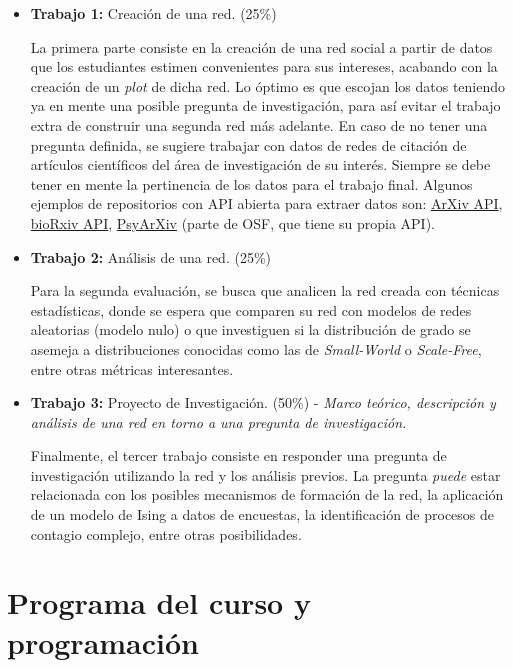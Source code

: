 \documentclass[12pt]{article}
\begin{document}
\begin{itemize}
    \item \textbf{Trabajo 1:} Creación de una red. (25\%)

La primera parte consiste en la creación de una red social a partir de datos que los estudiantes estimen convenientes para sus intereses, acabando con la creación de un \textit{plot} de dicha red. Lo óptimo es que escojan los datos teniendo ya en mente una posible pregunta de investigación, para así evitar el trabajo extra de construir una segunda red más adelante. En caso de no tener una pregunta definida, se sugiere trabajar con datos de redes de citación de artículos científicos del área de investigación de su interés. Siempre se debe tener en mente la pertinencia de los datos para el trabajo final. Algunos ejemplos de repositorios con API abierta para extraer datos son: \href{https://info.arxiv.org/help/api/index.html}{ArXiv API}, \href{https://api.biorxiv.org/}{bioRxiv API}, \href{https://osf.io/zab38/wiki/home/}{PsyArXiv} (parte de OSF, que tiene su propia API).
    
    \item \textbf{Trabajo 2:} Análisis de una red. (25\%)

Para la segunda evaluación, se busca que analicen la red creada con técnicas estadísticas, donde se espera que comparen su red con modelos de redes aleatorias (modelo nulo) o que investiguen si la distribución de grado se asemeja a distribuciones conocidas como las de \textit{Small-World} o \textit{Scale-Free}, entre otras métricas interesantes.
    
    \item \textbf{Trabajo 3:} Proyecto de Investigación. (50\%) - \textit{Marco teórico, descripción y análisis de una red en torno a una pregunta de investigación.}

Finalmente, el tercer trabajo consiste en responder una pregunta de investigación utilizando la red y los análisis previos. La pregunta \textit{puede} estar relacionada con los posibles mecanismos de formación de la red, la aplicación de un modelo de Ising a datos de encuestas, la identificación de procesos de contagio complejo, entre otras posibilidades.
\end{itemize}

\vspace{0.5cm}

\section{Programa del curso y programación}
\end{document}
